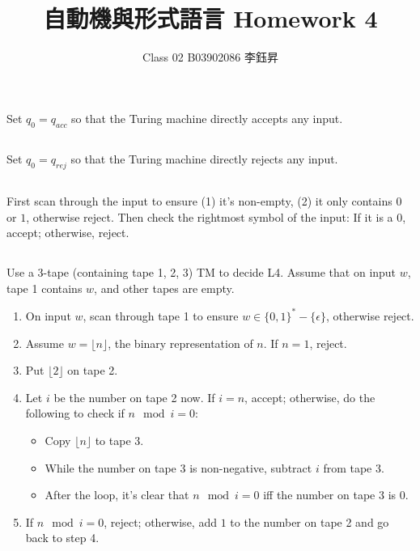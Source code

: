 \documentclass{article}
\title{自動機與形式語言 Homework 4}
\author{Class 02 B03902086 李鈺昇}
\date{}
\begin{document}
    \maketitle
    
    \section{}
        \subsection{}
            Set $q_0 = q_{acc}$ so that the Turing machine directly accepts any input.
        
        \subsection{}
            Set $q_0 = q_{rej}$ so that the Turing machine directly rejects any input.
    
        \subsection{}
            First scan through the input to ensure (1) it's non-empty, (2) it only contains $0$ or $1$, otherwise reject. Then check the rightmost symbol of the input: If it is a $0$, accept; otherwise, reject.

        \subsection{}
            Use a 3-tape (containing tape 1, 2, 3) TM to decide L4. Assume that on input $w$, tape 1 contains $w$, and other tapes are empty.
            \begin{enumerate}
                \item On input $w$, scan through tape 1 to ensure $w \in \{0, 1\}^* - \{\epsilon\}$, otherwise reject.
                \item Assume $w = \lfloor n \rfloor$, the binary representation of $n$. If $n = 1$, reject.
                \item Put $\lfloor 2 \rfloor$ on tape 2.
                \item Let $i$ be the number on tape 2 now. If $i = n$, accept; otherwise, do the following to check if $n \mod i = 0$:
                \begin{itemize}
                    \item Copy $\lfloor n \rfloor$ to tape 3.
                    \item While the number on tape 3 is non-negative, subtract $i$ from tape 3.
                    \item After the loop, it's clear that $n \mod i = 0$ iff the number on tape 3 is $0$.
                \end{itemize}
                \item If $n \mod i = 0$, reject; otherwise, add $1$ to the number on tape 2 and go back to step 4.
            \end{enumerate}
        
\end{document}
